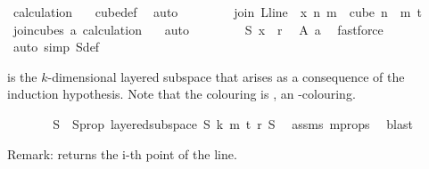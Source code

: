 \begin{isabellebody}
\ calculation\ {\isacharparenleft}{\kern0pt}{}{\isacharcomma}{\kern0pt}{}{\isacharparenright}{\kern0pt}\ \isamarkupfalse%
\ cube{\isacharunderscore}{\kern0pt}def\ \isamarkupfalse%
\ auto\isanewline
\ \ \ \ \ \isamarkupfalse%
\ \isamarkupfalse%
\ {\isachardoublequoteopen}join\ {\isacharparenleft}{\kern0pt}L{\isacharunderscore}{\kern0pt}line\ {}{\isacharparenright}{\kern0pt}\ x\ n\ m\ {\isasymin}\ cube\ {\isacharparenleft}{\kern0pt}n\ {\isacharplus}{\kern0pt}\ m{\isacharparenright}{\kern0pt}\ {\isacharparenleft}{\kern0pt}t{\isacharplus}{\kern0pt}{}{\isacharparenright}{\kern0pt}{\isachardoublequoteclose}\ \isamarkupfalse%
\ join{\isacharunderscore}{\kern0pt}cubes\ a\ calculation{\isacharparenleft}{\kern0pt}{}{\isacharcomma}{\kern0pt}\ {}{\isacharparenright}{\kern0pt}\ \isamarkupfalse%
\ auto\isanewline
\ \ \ \ \ \isamarkupfalse%
\ \isamarkupfalse%
\ {\isachardoublequoteopen}{\isasymchi}S\ x\ {\isasymin}\ {\isacharbraceleft}{\kern0pt}{\isachardot}{\kern0pt}{\isachardot}{\kern0pt}{\isacharless}{\kern0pt}r{\isacharbraceright}{\kern0pt}{\isachardoublequoteclose}\ \isamarkupfalse%
\ A\ a\ \isamarkupfalse%
\ fastforce\isanewline
\ \ \ \ \isamarkupfalse%
\ {\isacharparenleft}{\kern0pt}auto\ simp{\isacharcolon}{\kern0pt}\ {\isasymchi}S{\isacharunderscore}{\kern0pt}def{\isacharparenright}{\kern0pt}%
\begin{isamarkuptext}%
 is the $k$-dimensional layered subspace that arises as a consequence of the induction hypothesis. Note that the colouring is , an -colouring.%
\end{isamarkuptext}\isamarkuptrue%
\ \ \ \ \isamarkupfalse%
\ \isamarkupfalse%
\ S\ \ S{\isacharunderscore}{\kern0pt}prop{\isacharcolon}{\kern0pt}\ {\isachardoublequoteopen}layered{\isacharunderscore}{\kern0pt}subspace\ S\ k\ m\ t\ r\ {\isasymchi}S{\isachardoublequoteclose}\ \isamarkupfalse%
\ assms{\isacharparenleft}{\kern0pt}{}{\isacharparenright}{\kern0pt}\ m{\isacharunderscore}{\kern0pt}props\ \isamarkupfalse%
\ blast%
\begin{isamarkuptext}%
Remark:  returns the i-th point of the line.%
\end{isamarkuptext}\isamarkuptrue%

\end{isabellebody}
